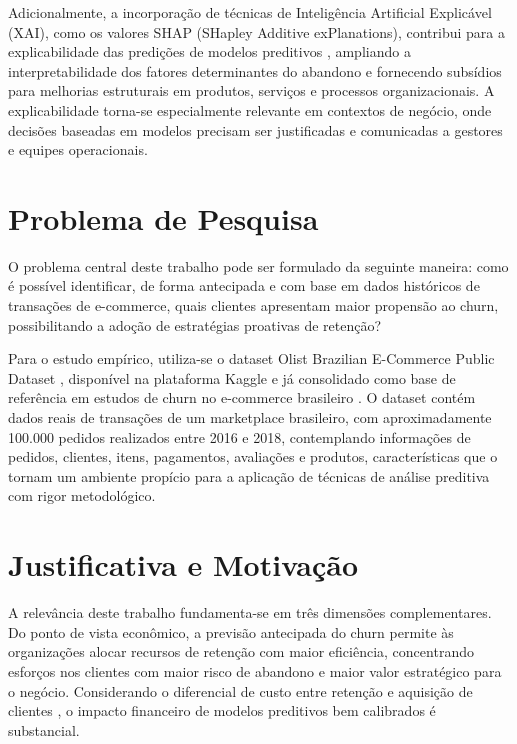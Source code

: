 Adicionalmente, a incorporação de técnicas de Inteligência Artificial Explicável (XAI), como os valores SHAP (SHapley Additive exPlanations), contribui para a explicabilidade das predições de modelos preditivos \cite{lundberg2017}, ampliando a interpretabilidade dos fatores determinantes do abandono e fornecendo subsídios para melhorias estruturais em produtos, serviços e processos organizacionais. A explicabilidade torna-se especialmente relevante em contextos de negócio, onde decisões baseadas em modelos precisam ser justificadas e comunicadas a gestores e equipes operacionais.

\FloatBarrier
\section{Problema de Pesquisa} \label{sec:problema}

O problema central deste trabalho pode ser formulado da seguinte maneira: como é possível identificar, de forma antecipada e com base em dados históricos de transações de e-commerce, quais clientes apresentam maior propensão ao churn, possibilitando a adoção de estratégias proativas de retenção?

Para o estudo empírico, utiliza-se o dataset Olist Brazilian E-Commerce Public Dataset \cite{olist2018}, disponível na plataforma Kaggle e já consolidado como base de referência em estudos de churn no e-commerce brasileiro \cite{matuszelanski2022}. O dataset contém dados reais de transações de um marketplace brasileiro, com aproximadamente 100.000 pedidos realizados entre 2016 e 2018, contemplando informações de pedidos, clientes, itens, pagamentos, avaliações e produtos, características que o tornam um ambiente propício para a aplicação de técnicas de análise preditiva com rigor metodológico.

\FloatBarrier
\section{Justificativa e Motivação} \label{sec:justificativa}

A relevância deste trabalho fundamenta-se em três dimensões complementares. Do ponto de vista econômico, a previsão antecipada do churn permite às organizações alocar recursos de retenção com maior eficiência, concentrando esforços nos clientes com maior risco de abandono e maior valor estratégico para o negócio. Considerando o diferencial de custo entre retenção e aquisição de clientes \cite{reichheld2000}, o impacto financeiro de modelos preditivos bem calibrados é substancial.

